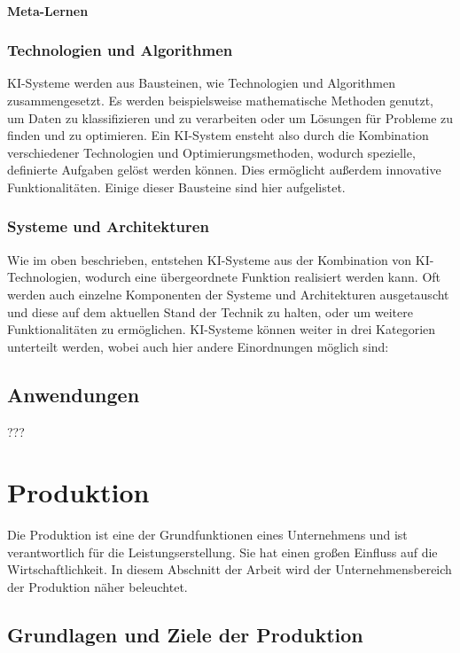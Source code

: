 \documentclass[a4paper,12pt, german]{report}
\begin{document}
\paragraph{Meta-Lernen} %

\subsubsection{Technologien und Algorithmen}
KI-Systeme werden aus Bausteinen, wie Technologien und Algorithmen zusammengesetzt. Es werden beispielsweise mathematische Methoden genutzt, um Daten zu klassifizieren und zu verarbeiten oder um Lösungen für Probleme zu finden und zu optimieren. Ein KI-System ensteht also durch die Kombination verschiedener Technologien und Optimierungsmethoden, wodurch spezielle, definierte Aufgaben gelöst werden können. Dies ermöglicht außerdem innovative Funktionalitäten. Einige dieser Bausteine sind hier aufgelistet.

\subsubsection{Systeme und Architekturen}
Wie im oben beschrieben, entstehen KI-Systeme aus der Kombination von KI-Technologien, wodurch eine übergeordnete Funktion realisiert werden kann. Oft werden auch einzelne Komponenten der Systeme und Architekturen ausgetauscht und diese auf dem aktuellen Stand der Technik zu halten, oder um weitere Funktionalitäten zu ermöglichen. KI-Systeme können weiter in drei Kategorien unterteilt werden, wobei auch hier andere Einordnungen möglich sind:



\subsection{Anwendungen}
???


\section{Produktion}

Die Produktion ist eine der Grundfunktionen eines Unternehmens und ist verantwortlich für die Leistungserstellung. Sie hat einen großen Einfluss auf die Wirtschaftlichkeit. In diesem Abschnitt der Arbeit wird der Unternehmensbereich der Produktion näher beleuchtet.

\subsection{Grundlagen und Ziele der Produktion}
\end{document}
